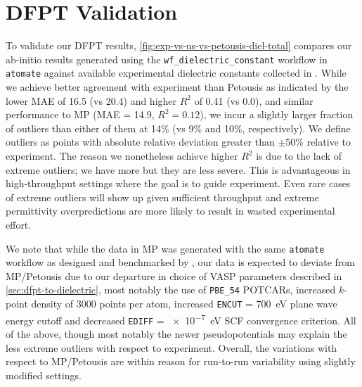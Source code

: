 \documentclass{article}
\begin{document}
\section{DFPT Validation}
\label{sec:dfpt-validation}

To validate our DFPT results, \cref{fig:exp-vs-us-vs-petousis-diel-total} compares our ab-initio results generated using the \texttt{wf\_dielectric\_constant} workflow in \texttt{atomate} \cite{mathew_atomate_2017} against available experimental dielectric constants collected in \cite{petousis_benchmarking_2016,petousis_high-throughput_2017}.
While we achieve better agreement with experiment than Petousis as indicated by the lower MAE of 16.5 (vs 20.4) and higher $R^2$ of 0.41 (vs 0.0), and similar performance to MP (MAE = 14.9, $R^2 = 0.12$), we incur a slightly larger fraction of outliers than either of them at 14\% (vs 9\% and 10\%, respectively). We define outliers as points with absolute relative deviation greater than $\pm 50\%$ relative to experiment.
The reason we nonetheless achieve higher $R^2$ is due to the lack of extreme outliers; we have more but they are less severe.
This is advantageous in high-throughput settings where the goal is to guide experiment.
Even rare cases of extreme outliers will show up given sufficient throughput and extreme permittivity overpredictions are more likely to result in wasted experimental effort.

We note that while the data in MP was generated with the same \texttt{atomate} workflow
as designed and benchmarked by \citeauthor*{petousis_benchmarking_2016}\cite{petousis_benchmarking_2016},
our data is expected to deviate from MP/Petousis due to our departure in choice of VASP parameters described in \cref{sec:dfpt-to-dielectric}, most notably the use of \texttt{PBE\_54} POTCARs, increased $k$-point density of 3000 points per atom, increased \texttt{ENCUT} = \SI{700}{eV} plane wave energy cutoff and decreased \texttt{EDIFF} = \SI{e-7}{eV} SCF convergence criterion.
All of the above, though most notably the newer pseudopotentials may explain the less extreme outliers with respect to experiment.
Overall, the variations with respect to MP/Petousis are within reason for run-to-run variability using slightly modified settings.
\end{document}
